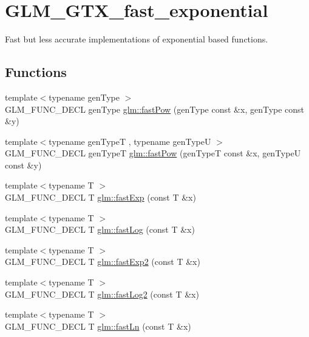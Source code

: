 \hypertarget{group__gtx__fast__exponential}{}\section{G\+L\+M\+\_\+\+G\+T\+X\+\_\+fast\+\_\+exponential}
\label{group__gtx__fast__exponential}


Fast but less accurate implementations of exponential based functions.  


\subsection*{Functions}
\begin{DoxyCompactItemize}
\item 
{\footnotesize template$<$typename gen\+Type $>$ }\\G\+L\+M\+\_\+\+F\+U\+N\+C\+\_\+\+D\+E\+CL gen\+Type \hyperlink{group__gtx__fast__exponential_ga842ec5e981c76f8aae7ae14972795378}{glm\+::fast\+Pow} (gen\+Type const \&x, gen\+Type const \&y)
\item 
{\footnotesize template$<$typename gen\+TypeT , typename gen\+TypeU $>$ }\\G\+L\+M\+\_\+\+F\+U\+N\+C\+\_\+\+D\+E\+CL gen\+TypeT \hyperlink{group__gtx__fast__exponential_ga08af6240d87ce7b9851c9095808c1eb8}{glm\+::fast\+Pow} (gen\+TypeT const \&x, gen\+TypeU const \&y)
\item 
{\footnotesize template$<$typename T $>$ }\\G\+L\+M\+\_\+\+F\+U\+N\+C\+\_\+\+D\+E\+CL T \hyperlink{group__gtx__fast__exponential_ga22a548f1bf42c53898c140e56af16529}{glm\+::fast\+Exp} (const T \&x)
\item 
{\footnotesize template$<$typename T $>$ }\\G\+L\+M\+\_\+\+F\+U\+N\+C\+\_\+\+D\+E\+CL T \hyperlink{group__gtx__fast__exponential_ga0130dd03ca124c27dc2094de7ee47e8a}{glm\+::fast\+Log} (const T \&x)
\item 
{\footnotesize template$<$typename T $>$ }\\G\+L\+M\+\_\+\+F\+U\+N\+C\+\_\+\+D\+E\+CL T \hyperlink{group__gtx__fast__exponential_ga62216328ac3af1811add813d0804437d}{glm\+::fast\+Exp2} (const T \&x)
\item 
{\footnotesize template$<$typename T $>$ }\\G\+L\+M\+\_\+\+F\+U\+N\+C\+\_\+\+D\+E\+CL T \hyperlink{group__gtx__fast__exponential_gadff374a7349142c0ae65f476b9bf4886}{glm\+::fast\+Log2} (const T \&x)
\item 
{\footnotesize template$<$typename T $>$ }\\G\+L\+M\+\_\+\+F\+U\+N\+C\+\_\+\+D\+E\+CL T \hyperlink{group__gtx__fast__exponential_ga8f27c4779039f88ae790a9a69be01630}{glm\+::fast\+Ln} (const T \&x)
\end{DoxyCompactItemize}


